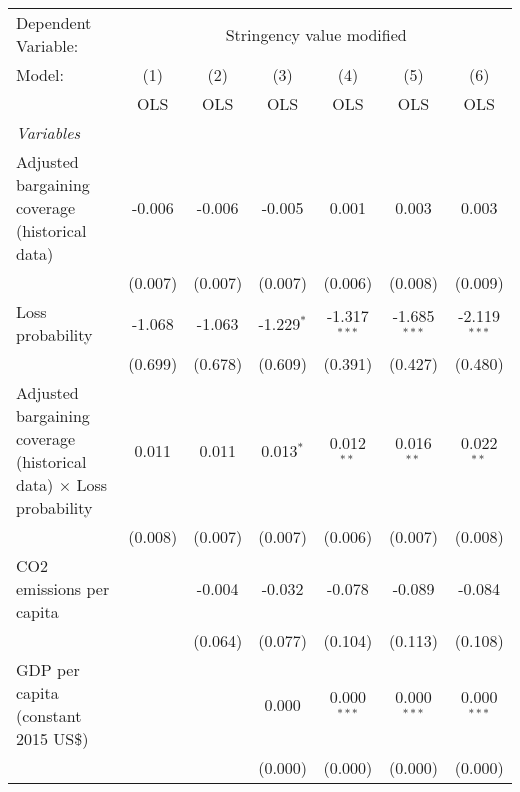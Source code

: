 
\begingroup
\centering
\begin{tabular}{lcccccc}
   \toprule
   Dependent Variable: & \multicolumn{6}{c}{Stringency value modified}\\
   Model:                                                                    & (1)     & (2)     & (3)          & (4)            & (5)            & (6)\\  
                                                                             &  OLS    & OLS     & OLS          & OLS            & OLS            & OLS\\  
   \midrule
   \emph{Variables}\\
   Adjusted bargaining coverage (historical data)                            & -0.006  & -0.006  & -0.005       & 0.001          & 0.003          & 0.003\\   
                                                                             & (0.007) & (0.007) & (0.007)      & (0.006)        & (0.008)        & (0.009)\\   
   Loss probability                                                          & -1.068  & -1.063  & -1.229$^{*}$ & -1.317$^{***}$ & -1.685$^{***}$ & -2.119$^{***}$\\   
                                                                             & (0.699) & (0.678) & (0.609)      & (0.391)        & (0.427)        & (0.480)\\   
   Adjusted bargaining coverage (historical data) $\times$ Loss probability  & 0.011   & 0.011   & 0.013$^{*}$  & 0.012$^{**}$   & 0.016$^{**}$   & 0.022$^{**}$\\   
                                                                             & (0.008) & (0.007) & (0.007)      & (0.006)        & (0.007)        & (0.008)\\   
   CO2 emissions per capita                                                  &         & -0.004  & -0.032       & -0.078         & -0.089         & -0.084\\   
                                                                             &         & (0.064) & (0.077)      & (0.104)        & (0.113)        & (0.108)\\   
   GDP per capita (constant 2015 US\$)                                       &         &         & 0.000        & 0.000$^{***}$  & 0.000$^{***}$  & 0.000$^{***}$\\   
                                                                             &         &         & (0.000)      & (0.000)        & (0.000)        & (0.000)\\   

\end{tabular}
